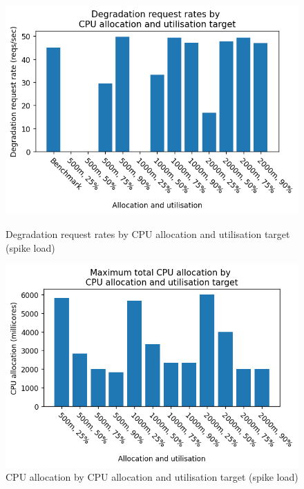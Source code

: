 \begin{figure}[h]
    \centering
    \begin{minipage}{.45\textwidth}
        \centering
        \includegraphics[width=\linewidth]{figures/uor-rau-spike-degradation-reqs.png}
        \caption{Degradation request rates by CPU allocation and utilisation target (spike load)}
        \label{figure:uor-resource-allocation-deg-comp-spike}
    \end{minipage}%
    \hspace{0.05\textwidth} %
    \begin{minipage}{.45\textwidth}
      \centering
      \includegraphics[width=\linewidth]{figures/uor-rau-spike-cpu-allocation.png}

      \caption{CPU allocation by CPU allocation and utilisation target (spike load)}
      \label{figure:uor-resource-allocation-spike-cpu-allocation}
    \end{minipage}
\end{figure}

